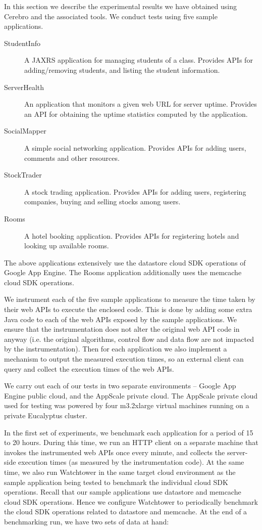 In this section we describe the experimental results we have obtained using Cerebro and the associated tools. We conduct
tests using five sample applications. 

\begin{description}
\item[StudentInfo] A JAXRS application for managing students of a class. Provides APIs for
adding/removing students, and listing the student information.
\item[ServerHealth] An application that monitors a given web URL for server uptime. Provides an
API for obtaining the uptime statistics computed by the application.
\item[SocialMapper] A simple social networking application. Provides APIs for adding users,
comments and other resources.
\item[StockTrader] A stock trading application. Provides APIs for adding users, registering
companies, buying and selling stocks among users.
\item[Rooms] A hotel booking application. Provides APIs for registering hotels and looking up
available rooms.
\end{description}

The above applications extensively use the datastore cloud SDK operations of Google App Engine. The Rooms application
additionally uses the memcache cloud SDK operations.

We instrument each of the five sample applications to measure the time taken by their web APIs to execute the
enclosed code. This is done by adding some extra Java code to each of the web APIs exposed by the sample applications.
We ensure that the instrumentation does not alter the original web API code in anyway (i.e. the original algorithms, control flow
and data flow are not impacted by the instrumentation). Then for each application we also
implement a mechanism to output the measured execution times, so an external client can query and collect the execution
times of the web APIs.

We carry out each of our tests in two separate environments -- Google App Engine public cloud, and
the AppScale private cloud. The AppScale private cloud used for testing was powered by four m3.2xlarge virtual machines 
running on a private Eucalyptus cluster.

In the first set of experiments, we benchmark each application for a period of 15 to 20 hours.
During this time, we run an HTTP client on a separate machine that invokes the instrumented web APIs once every minute, 
and collects the server-side execution times (as measured by the instrumentation code).
At the same time, we also run Watchtower in the same target cloud environment as the sample application being tested to
benchmark the individual cloud SDK operations. Recall that our sample applications use datastore and memcache
cloud SDK operations. Hence
we configure Watchtower to periodically benchmark the cloud SDK operations related to datastore and memcache. 
At the end of a benchmarking run, we have two sets of data at hand:

